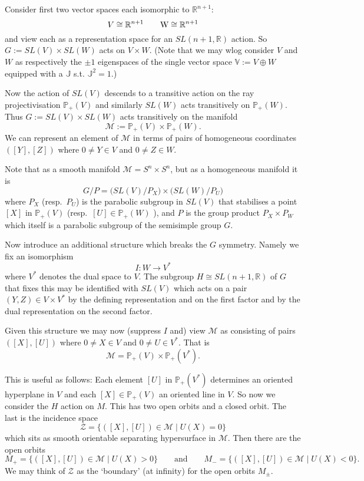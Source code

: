 Consider first two vector spaces each isomorphic to $\mathbb{R}^{n+1}$:
$$
V\cong \mathbb{R}^{n+1} \qquad \mbox W \cong \mathbb{R}^{n+1}
$$
and view each as a representation space for an $SL(n+1,\mathbb{R})$
action.  So $G:= SL(V)\times SL(W)$ acts on $V\times W$. (Note that we may
wlog consider $V$ and $W$ as respectively the $\pm 1$ eigenspaces of
the single vector space $\mathbb{V}:=V\oplus W$ equipped with a
$\mathbb{J}$ s.t. $\mathbb{J}^2=1$.)

Now the action of $SL(V)$ descends to a transitive action on the ray
projectivisation $\mathbb{P}_+(V)$ and similarly $SL(W)$ acts
transitively on $\mathbb{P}_+(W)$. Thus  $G:= SL(V)\times SL(W)$ acts transitively on the manifold
$$
{\mathcal M}:= \mathbb{P}_+(V) \times \mathbb{P}_+(W).
$$
We can represent an element of $\mathcal{M}$ in terms of pairs of homogeneous coordinates
$([Y],[Z])$ where $0\neq Y\in V$ and $0\neq Z\in W$.

Note that as a smooth manifold $\mathcal{M}=S^n\times S^n$, but as a homogeneous manifold it is
$$
G/P = \big( SL(V)/P_X \big)\times \big( SL(W)/P_U \big)
$$
where $P_X$ (resp.\ $P_U$) is the parabolic subgroup in $SL(V)$
that stabilises a point $[X]$ in $\mathbb{P}_+(V)$ (resp.\ $[U] \in \mathbb{P}_+(W)$
), and $P$ is the group product $P_X\times P_W$ which itself is a
parabolic subgroup of the semisimple group $G$.

Now introduce an additional structure which breaks the $G$
symmetry. 
Namely we fix an isomorphism
$$
I:W\to V^*
$$
where $V^*$ denotes the dual space to $V$. The subgroup $H\cong SL(n+1,\mathbb{R})$ of $G$
that fixes this may be identified with $SL(V)$ which acts on a pair
$(Y,Z)\in V\times V^*$ by the defining representation and on the first
factor and by the dual representation on the second factor.

Given this structure we may now (suppress $I$ and) view ${\mathcal{M}}$ as
consisting of pairs $([X],[U])$ where $0\neq X\in V$ and $0\neq U\in
V^*$. That is 
$$
{\mathcal{M}}= \mathbb{P}_+(V) \times \mathbb{P}_+(V^*).
$$

This is useful as follows: Each element $[U]$ in
$\mathbb{P}_+(V^*)$ determines an oriented  hyperplane in $V$ and each $[X]\in
\mathbb{P}_+(V)$ an oriented line in $V$.  So now we consider the $H$
action on $M$. This has two open orbits and a closed orbit. The last
is the incidence space 
$$
\mathcal{Z}=\{ ([X],[U])\in \mathcal{M} \mid U(X)=0 \} 
$$
which sits as smooth orientable separating hypersurface in $\mathcal{M}$. Then there are the open orbits
$$
M_+=\{ ([X],[U])\in \mathcal{M} \mid U(X)>0 \} \qquad \mbox{and} \qquad
M_-=\{ ([X],[U])\in \mathcal{M} \mid U(X)<0 \}.
$$
We may think of $\mathcal{Z}$ as the `boundary' (at infinity) for the open orbits $M_\pm$.

